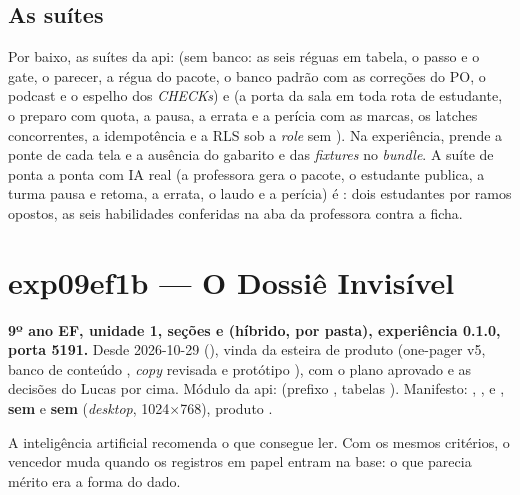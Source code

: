 \subsection*{As suítes}

Por baixo, as suítes da api: 
(sem banco: as seis réguas em tabela, o passo e o gate, o parecer, a régua do
pacote, o banco padrão com as correções do PO, o podcast e o espelho dos
\emph{CHECKs}) e  (a
porta da sala em toda rota de estudante, o preparo com quota, a pausa, a
errata e a perícia com as marcas, os latches concorrentes, a idempotência e
a RLS sob a \emph{role} sem ). Na experiência,
 prende a ponte de cada tela e a ausência do
gabarito e das \emph{fixtures} no \emph{bundle}. A suíte de ponta a ponta com
IA real (a professora gera o pacote, o estudante publica, a turma pausa e
retoma, a errata, o laudo e a perícia) é :
dois estudantes por ramos opostos, as seis habilidades conferidas na aba da
professora contra a ficha.

\section{exp09ef1b --- O Dossiê Invisível}
\label{sec:exp09ef1b}

\textbf{9º ano EF, unidade 1, seções  e 
(híbrido, por pasta), experiência 0.1.0, porta 5191.} Desde 2026-10-29
(), vinda da esteira de produto (one-pager v5, banco de
conteúdo , \emph{copy} revisada  e protótipo ), com o
plano aprovado e as decisões do Lucas por cima. Módulo da api:
 (prefixo , tabelas
). Manifesto: , ,  e
, \textbf{sem}  e \textbf{sem} 
(\emph{desktop}, 1024$\times$768), produto .

\begin{destaque}
A inteligência artificial recomenda o que consegue ler. Com os mesmos
critérios, o vencedor muda quando os registros em papel entram na base: o que
parecia mérito era a forma do dado.
\end{destaque}

